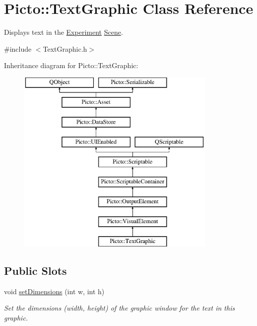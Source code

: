 \hypertarget{class_picto_1_1_text_graphic}{\section{Picto\-:\-:Text\-Graphic Class Reference}
\label{class_picto_1_1_text_graphic}
}


Displays text in the \hyperlink{class_picto_1_1_experiment}{Experiment} \hyperlink{class_picto_1_1_scene}{Scene}.  




{\ttfamily \#include $<$Text\-Graphic.\-h$>$}

Inheritance diagram for Picto\-:\-:Text\-Graphic\-:\begin{figure}[H]
\begin{center}
\leavevmode
\includegraphics[height=9.000000cm]{class_picto_1_1_text_graphic}
\end{center}
\end{figure}
\subsection*{Public Slots}
\begin{DoxyCompactItemize}
\item 
\hypertarget{class_picto_1_1_text_graphic_a776e86dd59dd3d706191ed3c708fe536}{void \hyperlink{class_picto_1_1_text_graphic_a776e86dd59dd3d706191ed3c708fe536}{set\-Dimensions} (int w, int h)}\label{class_picto_1_1_text_graphic_a776e86dd59dd3d706191ed3c708fe536}

\begin{DoxyCompactList}\small\item\em Set the dimensions (width, height) of the graphic window for the text in this graphic. \end{DoxyCompactList}\end{DoxyCompactItemize}
